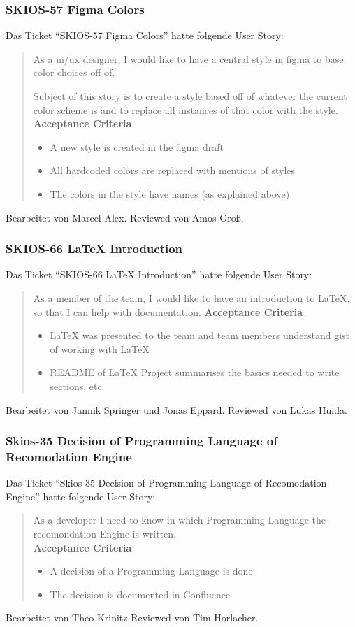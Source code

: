 \subsubsection{SKIOS-57 Figma Colors}
Das Ticket \enquote{SKIOS-57 Figma Colors} hatte folgende User Story:
\begin{quotation}
    As a ui/ux designer, I would like to have a central style in figma to base color choices off of.

    Subject of this story is to create a style based off of whatever the current color scheme is and to replace all instances of that color with the style. \\

\textbf{Acceptance Criteria}
\begin{itemize}
    \item A new style is created in the figma draft
    \item All hardcoded colors are replaced with mentions of styles
    \item The colors in the style have names (as explained above)
\end{itemize}
\end{quotation}
Bearbeitet von Marcel Alex.
Reviewed von Amos Groß.

\subsubsection{SKIOS-66 LaTeX Introduction}
Das Ticket \enquote{SKIOS-66 LaTeX Introduction} hatte folgende User Story:
\begin{quotation}
    As a member of the team, I would like to have an introduction to LaTeX, so that I can help with documentation.
\textbf{Acceptance Criteria}
\begin{itemize}
    \item LaTeX was presented to the team and team members understand gist of working with LaTeX
    \item README of LaTeX Project summarises the basics needed to write sections, etc.
\end{itemize}
\end{quotation}
Bearbeitet von Jannik Springer und Jonas Eppard.
Reviewed von Lukas Huida.

\subsubsection{Skios-35 Decision of Programming Language of Recomodation Engine}
Das Ticket \enquote{Skios-35 Decision of Programming Language of Recomodation Engine} hatte folgende User Story:
\begin{quotation}
    As a developer I need to know in which Programming Language the recomondation Engine is written. \\
    \textbf{Acceptance Criteria}
    \begin{itemize}
        \item A decision of a Programming Language is done
        \item The decision is documented in Confluence
    \end{itemize}    
\end{quotation}
Bearbeitet von Theo Krinitz
Reviewed von Tim Horlacher.

